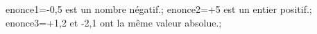 \documentclass[exercice]{thedocument}%
\begin{document}
%
    \>enonce1=-0,5 est un nombre négatif.;%
    \>enonce2=+5 est un entier positif.;%
    \>enonce3=+1,2 et -2,1 ont la même valeur absolue.;%
\end{document}
